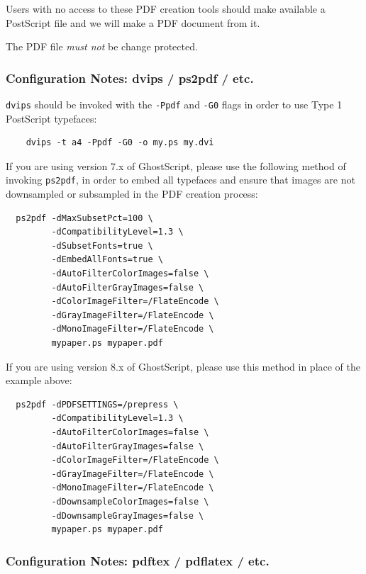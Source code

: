 \documentclass{egpubl-eurovis-short}
\begin{document}
Users with no access to these PDF creation tools should make available a
PostScript file and we will make a PDF document from it.


The PDF file \emph{must not} be change protected.

\subsubsection*{Configuration Notes: dvips / ps2pdf / etc.}

\noindent
\texttt{dvips} should be invoked with the \texttt{-Ppdf} and \texttt{-G0}
flags in order to use Type 1 PostScript typefaces:

\begin{verbatim}
    dvips -t a4 -Ppdf -G0 -o my.ps my.dvi
\end{verbatim}


\noindent
If you are using version 7.x of GhostScript, please use the following method of invoking \texttt{ps2pdf}, in
order to embed all typefaces and ensure that images are not downsampled or subsampled in the PDF
creation process:

\begin{verbatim}
  ps2pdf -dMaxSubsetPct=100 \
         -dCompatibilityLevel=1.3 \
         -dSubsetFonts=true \
         -dEmbedAllFonts=true \
         -dAutoFilterColorImages=false \
         -dAutoFilterGrayImages=false \
         -dColorImageFilter=/FlateEncode \
         -dGrayImageFilter=/FlateEncode \
         -dMonoImageFilter=/FlateEncode \
         mypaper.ps mypaper.pdf
\end{verbatim}


If you are using version 8.x of GhostScript, please use this method in place of the example above:
\begin{verbatim}
  ps2pdf -dPDFSETTINGS=/prepress \
         -dCompatibilityLevel=1.3 \
         -dAutoFilterColorImages=false \
         -dAutoFilterGrayImages=false \
         -dColorImageFilter=/FlateEncode \
         -dGrayImageFilter=/FlateEncode \
         -dMonoImageFilter=/FlateEncode \
         -dDownsampleColorImages=false \
         -dDownsampleGrayImages=false \
         mypaper.ps mypaper.pdf
\end{verbatim}

\subsubsection*{Configuration Notes: pdftex / pdflatex / etc.}
\end{document}
